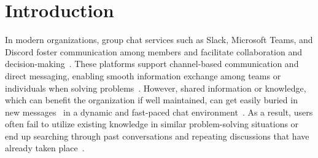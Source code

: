 \documentclass[sigconf,screen]{acmart}
\newcommand{\out}[1]{#1}
\newcommand{\sang}[1]{\out{{\small\textcolor{blue}{\bf [*** Sang: #1]}}}}
\begin{document}
\maketitle


\section{Introduction}
In modern organizations, group chat services such as Slack, Microsoft Teams, and Discord foster communication among members and facilitate collaboration and decision-making~\cite{handel2002chat, zhang2018making}. These platforms support channel-based communication and direct messaging, enabling smooth information exchange among teams or individuals when solving problems~\cite{wang2022group}. However, shared information or knowledge, which can benefit the organization if well maintained, can get easily buried in new messages~\cite{zhang2018making} in a dynamic and fast-paced chat environment~\cite{cameron2005unintended}. As a result, users often fail to utilize existing knowledge in similar problem-solving situations or end up searching through past conversations and repeating discussions that have already taken place~\cite{zhang2018making}.
\end{document}
